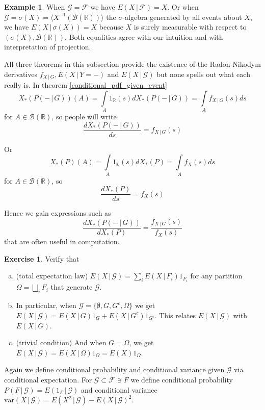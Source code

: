 \documentclass[12pt]{amsart}
\theoremstyle{definition}
\newtheorem{example}[theorem]{Example}
\newtheorem{exercise}[theorem]{Exercise}
\begin{document}
\begin{example} \label{expectedvalueXgivenForYgivensigmaY} When $\mathcal{G} = \mathcal{F}$ we have $E(X \,|\, \mathcal{F}) = X$. Or when $\mathcal{G} = \sigma(X) = \langle X^{-1}(\mathcal{B}(\mathbb{R})) \rangle$ the $\sigma$-algebra generated by all events about $X$, we have $E(X \,|\, \sigma(X)) = X$ because $X$ is surely measurable with respect to $(\sigma(X), \mathcal{B}(\mathbb{R}))$. Both equalities agree with our intuition and with interpretation of projection.
\end{example}

All three theorems in this subsection provide the existence of the Radon-Nikodym derivatives $f_{X \,|\, G}, E(X \,|\, Y = -)$ and $E(X \,|\, \mathcal{G})$ but none spells out what each really is. In theorem \ref{conditional_pdf_given_event}
$$X_*(P( - \,|\, G))(A) = \int\limits_A 1_{\mathbb{R}}(s) dX_*(P( - \,|\, G)) = \int\limits_A f_{X \,|\, G}(s) ds$$
for $A \in \mathcal{B}(\mathbb{R})$, so people will write
$$\frac{dX_*(P( - \,|\, G))}{ds} = f_{X \,|\, G}(s)$$

Or
$$X_*(P)(A) = \int\limits_A 1_{\mathbb{R}}(s) dX_*(P) = \int\limits_A f_X(s)ds$$
for $A \in \mathcal{B}(\mathbb{R})$, so
$$\frac{dX_*(P)}{ds} = f_X(s)$$

Hence we gain expressions such as
$$\frac{dX_*(P(- \,|\, G))}{dX_*(P)} = \frac{f_{X \,|\, G}(s)}{f_X(s)}$$
that are often useful in computation.

\begin{exercise} \label{properties_of_E(X_given_trivial_algebra)} Verify that
\begin{enumerate}[a.]
\item (total expectation law) $E(X \,|\, \mathcal{G}) = \sum\limits_i E(X \,|\, F_i)1_{F_i}$ for any partition $\Omega = \bigsqcup\limits_i F_i$ that generate $\mathcal{G}$.
\item In particular, when $\mathcal{G} = \{\emptyset, G, G^c, \Omega\}$ we get $E(X \,|\, \mathcal{G}) = E(X \,|\, G)1_G + E(X \,|\, G^c) 1_{G^c}$. This relates $E(X \,|\, \mathcal{G})$ with $E(X \,|\, G)$.
\item (trivial condition) And when $G = \Omega$, we get $E(X \,|\, \mathcal{G}) = E(X \,|\, \Omega)1_{\Omega} = E(X)1_{\Omega}$.
\end{enumerate}
\end{exercise}

Again we define conditional probability and conditional variance given $\mathcal{G}$ via conditional expectation.
\dfn\label{probabilityandvarianceviaexpectation2} For $\mathcal{G} \subset \mathcal{F} \owns F$ we define conditional probability $P(F \,|\, \mathcal{G}) = E(1_F \,|\, \mathcal{G})$ and conditional variance $\text{var}(X \,|\, \mathcal{G}) = E(X^2 \,|\, \mathcal{G}) - E(X \,|\, \mathcal{G})^2$.
\end{document}
